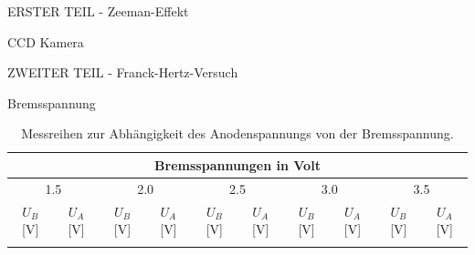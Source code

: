 \begin{appendix}
\begin{chapter}{ERSTER TEIL - Zeeman-Effekt}
\begin{section}{CCD Kamera}
    \end{section}
    
  \end{chapter}
  
  
  
  \begin{chapter}{ZWEITER TEIL - Franck-Hertz-Versuch}
    \label{Anhang:chp:FH}
    
    
    
    \begin{section}{Bremsspannung}
      \label{Anhang:chp:FHbremsspannung}
      
      \begin{scriptsize}
        \begin{longtable}[htbp]{|c|c|c|c|c|c|c|c|c|c|}
          \hline
          \multicolumn{10}{|c|}{Bremsspannungen in Volt} \\ \hline 
          \multicolumn{2}{|c|}{1.5} & \multicolumn{2}{|c|}{2.0} &
          \multicolumn{2}{|c|}{2.5} & \multicolumn{2}{|c|}{3.0} & 
          \multicolumn{2}{|c|}{3.5} \\ \hline
          $U_{B}$ [V] & $U_{A}$ [V] & $U_{B}$ [V] & $U_{A}$ [V] &
          $U_{B}$ [V] & $U_{A}$ [V] & $U_{B}$ [V] & $U_{A}$ [V] &
          $U_{B}$ [V] & $U_{A}$ [V] \\ \hline\hline \endhead
          
          \caption{Messreihen zur Abhängigkeit des Anodenspannungs von der
              Bremsspannung.}
          \label{tab:FHbremsspannung}
        \end{longtable}
      \end{scriptsize}
      

\end{section}
\end{chapter}
\end{appendix}
